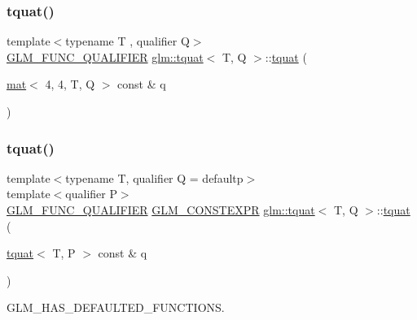 \mbox{\label{structglm_1_1tquat_adf5a3881bf63586dd6a1c26f59fee6c8}} 
\subsubsection{\texorpdfstring{tquat()}{tquat()}\hspace{0.1cm}{\footnotesize\ttfamily [10/12]}}
{\footnotesize\ttfamily template$<$typename T , qualifier Q$>$ \\
\hyperlink{setup_8hpp_a33fdea6f91c5f834105f7415e2a64407}{G\+L\+M\+\_\+\+F\+U\+N\+C\+\_\+\+Q\+U\+A\+L\+I\+F\+I\+ER} \hyperlink{structglm_1_1tquat}{glm\+::tquat}$<$ T, Q $>$\+::\hyperlink{structglm_1_1tquat}{tquat} (\begin{DoxyParamCaption}\item[{\hyperlink{structglm_1_1mat}{mat}$<$ 4, 4, T, Q $>$ const \&}]{q }\end{DoxyParamCaption})}

\mbox{\label{structglm_1_1tquat_ab59e0622b75684ae91e699d2f4b41cef}} 
\subsubsection{\texorpdfstring{tquat()}{tquat()}\hspace{0.1cm}{\footnotesize\ttfamily [11/12]}}
{\footnotesize\ttfamily template$<$typename T, qualifier Q = defaultp$>$ \\
template$<$qualifier P$>$ \\
\hyperlink{setup_8hpp_a33fdea6f91c5f834105f7415e2a64407}{G\+L\+M\+\_\+\+F\+U\+N\+C\+\_\+\+Q\+U\+A\+L\+I\+F\+I\+ER} \hyperlink{setup_8hpp_a08b807947b47031d3a511f03f89645ad}{G\+L\+M\+\_\+\+C\+O\+N\+S\+T\+E\+X\+PR} \hyperlink{structglm_1_1tquat}{glm\+::tquat}$<$ T, Q $>$\+::\hyperlink{structglm_1_1tquat}{tquat} (\begin{DoxyParamCaption}\item[{\hyperlink{structglm_1_1tquat}{tquat}$<$ T, P $>$ const \&}]{q }\end{DoxyParamCaption})}



G\+L\+M\+\_\+\+H\+A\+S\+\_\+\+D\+E\+F\+A\+U\+L\+T\+E\+D\+\_\+\+F\+U\+N\+C\+T\+I\+O\+NS. 

